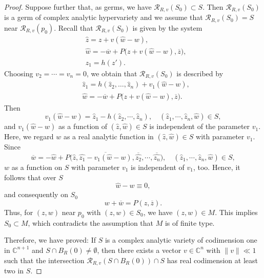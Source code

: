 \documentclass[10pt,a4paper]{amsart}
\begin{document}
\begin{proof}
Suppose further that, as germs, we have \(\mathcal R_{R,v}(S_0)\subset S\). Then $\mathcal R_{R, v}(S_0)$ is a germ of complex analytic hypervariety and we assume that $\mathcal R_{R, v}(S_0)=S$ near $\mathcal R_{R, v}(p_0)$.  Recall that \(\mathcal R_{R,v}(S_0)\) is given by the system
\begin{equation*}
\begin{split}
&\widehat z = z+v(\widehat w-w),\\
&\widehat w = -\overline w + P\bigl(z+v(\widehat w-w),\overline z\bigr),\\
&z_1 = h(z').
\end{split}
\end{equation*}
Choosing \(v_2=\cdots =v_{n}=0\), we obtain that 
\(\mathcal R_{R,v}(S_0)\) is described by
\begin{equation*}
\begin{split}
&\widehat z_1 = h(\widehat z_2,\dots ,\widehat z_{n}) + v_1(\widehat w-w),\\
&\widehat w = -\overline w + P\bigl(z+v(\widehat w-w),\overline z\bigr).
\end{split}
\end{equation*}
Then
\begin{equation*}
    v_1(\widehat w-w)=\widehat z_1-h(\widehat z_2, \cdots, \widehat z_n),\quad (\widehat z_1, \cdots, \widehat z_n, \widehat w)\in S,
\end{equation*}
and $v_1(\widehat w-w)$ as a function of $(\widehat{z},\widehat{w})\in S$ is independent of the parameter $v_1$. 
Here, we regard $w$ as a real analytic function in $(\widehat{z},\widehat{w})\in S$ with parameter $v_1$. Since 
$$\overline w = -\widehat w + P\bigl(\widehat{z}, \overline{\widehat{z_1}-v_1(\widehat{w}-w)},
\overline{\widehat{z_2}},\cdots,\overline{\widehat{z_n}}), \quad (\widehat z_1, \cdots, \widehat z_n, \widehat w)\in S,
$$
$w$ as a function on $S$ with parameter $v_1$ is independent of $v_1$, too.
Hence, it follows that over $S$
\[
\widehat w - w \equiv 0,
\]
and consequently on $S_0$
\[
w+\overline w = P(z,\overline z).
\]
Thus, for \((z,w)\) near \(p_0\) with \((z,w)\in S_0\), we have \((z,w)\in  M\). This implies \(S_0 \subset  M\), which contradicts the assumption  that \(M\) is of finite type.

Therefore, we have proved: If \(S\) is a complex analytic variety of codimension one in \(\mathbb C^{n+1}\) and \(S\cap B_R(0)\neq \emptyset\), then there exists a vector \(v\in\mathbb C^{n}\) with \(\|v\|\ll 1\) such that the intersection \(\mathcal R_{R,v}(S\cap B_R(0))\cap S\) has real codimension at least two in  $S$.
\end{proof}
\end{document}

